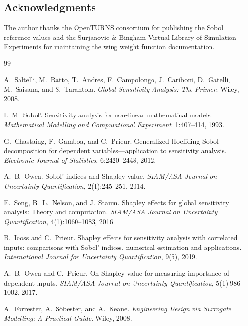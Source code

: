 \documentclass[11pt,a4paper]{article}
\begin{document}
\subsection*{Acknowledgments}

The author thanks the OpenTURNS consortium for publishing the Sobol reference values and the Surjanovic \& Bingham Virtual Library of Simulation Experiments for maintaining the wing weight function documentation.

\begin{thebibliography}{99}

A.~Saltelli, M.~Ratto, T.~Andres, F.~Campolongo, J.~Cariboni, D.~Gatelli, M.~Saisana, and S.~Tarantola.
\newblock \textit{Global Sensitivity Analysis: The Primer}.
\newblock Wiley, 2008.

I.~M.~Sobol'.
\newblock Sensitivity analysis for non-linear mathematical models.
\newblock \textit{Mathematical Modelling and Computational Experiment}, 1:407--414, 1993.

G.~Chastaing, F.~Gamboa, and C.~Prieur.
\newblock Generalized Hoeffding-Sobol decomposition for dependent variables---application to sensitivity analysis.
\newblock \textit{Electronic Journal of Statistics}, 6:2420--2448, 2012.

A.~B.~Owen.
\newblock Sobol' indices and Shapley value.
\newblock \textit{SIAM/ASA Journal on Uncertainty Quantification}, 2(1):245--251, 2014.

E.~Song, B.~L.~Nelson, and J.~Staum.
\newblock Shapley effects for global sensitivity analysis: Theory and computation.
\newblock \textit{SIAM/ASA Journal on Uncertainty Quantification}, 4(1):1060--1083, 2016.

B.~Iooss and C.~Prieur.
\newblock Shapley effects for sensitivity analysis with correlated inputs: comparisons with Sobol' indices, numerical estimation and applications.
\newblock \textit{International Journal for Uncertainty Quantification}, 9(5), 2019.

A.~B.~Owen and C.~Prieur.
\newblock On Shapley value for measuring importance of dependent inputs.
\newblock \textit{SIAM/ASA Journal on Uncertainty Quantification}, 5(1):986--1002, 2017.

A.~Forrester, A.~S\'obester, and A.~Keane.
\newblock \textit{Engineering Design via Surrogate Modelling: A Practical Guide}.
\newblock Wiley, 2008.


\end{thebibliography}
\end{document}
